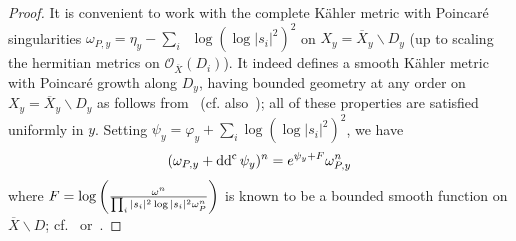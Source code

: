 \documentclass[a4paper, 11pt]{amsart}
\theoremstyle{plain}
\numberwithin{equation}{section} %
\numberwithin{figure}{section} %
\theoremstyle{plain}
\theoremstyle{plain}
\theoremstyle{plain}
\theoremstyle{plain}
\theoremstyle{remark}
\theoremstyle{definition}
\theoremstyle{definition}
\DeclareMathOperator \Vol {{\rm Vol}}
\DeclareMathOperator \ddc{\textrm{dd}^c}
\begin{document}
\begin{proof}

\smallskip
It is convenient to work with the complete K\"ahler metric with Poincar\'e singularities $\omega_{P,y}=\eta_y-\sum_i\ddc\log(\log|s_i|^2)^2$ on $X_y=\overline{X}_y\backslash D_{y}$ (up to scaling the hermitian metrics on $\mathcal{O}_{\overline{X}}(D_i)$). It indeed defines 
a smooth K\"ahler metric with  Poincar\'e growth along $D_y$, having
bounded geometry at any order on $X_y=\overline{X}_y\backslash D_{y}$ as follows from~\cite[\S 1]{guenancia14-kahler-mixed}
(cf. also~\cite[Lemma 2]{Kobayashi84-KE-open}); all of these properties are satisfied uniformly in $y$. Setting $\psi_y=\varphi_y+\sum_i\log(\log|s_i|^2)^2$,
we have
\[ (\omega_{{\rm P},y}+\ddc \psi_y)^n= e^{\psi_y+F}\omega_{{\rm P},y}^n\]
where $F=\log\left( \frac{\omega^n} {\prod_i|s_i|^2\log|s_i|^2\omega_{\rm P}^n}\right)$ is known to be a bounded smooth function on $\overline{X}\backslash D$; cf.~\cite[Lemma 1.6]{guenancia14-kahler-mixed} or~\cite[Proposition 2.1]{carlson-Griffiths72}. 


\end{proof}
\end{document}
